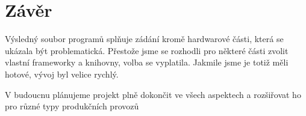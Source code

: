 \chapter*{Závěr}

Výsledný soubor programů splňuje zádání kromě hardwarové části, která
se ukázala být problematická. Přestože jsme se rozhodli pro některé
části zvolit vlastní frameworky a knihovny, volba se vyplatila.
Jakmile jsme je totiž měli hotové, vývoj byl velice rychlý.

V budoucnu plánujeme projekt plně dokončit ve všech aspektech a
rozšiřovat ho pro různé typy produkčních provozů
